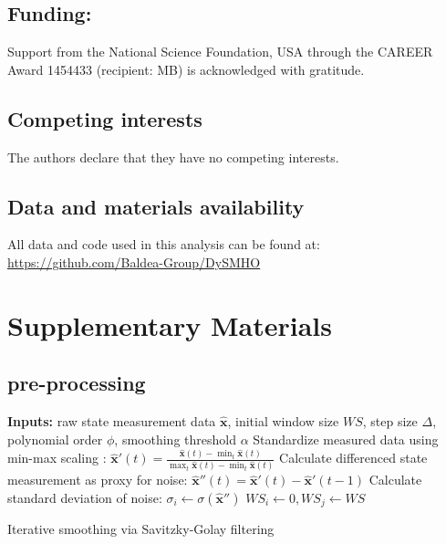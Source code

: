 \documentclass[12pt]{article}
\begin{document}
\subsection*{Funding:}
Support from the National Science Foundation, USA through the CAREER Award 1454433 (recipient: MB) is acknowledged with gratitude.



\subsection*{Competing interests}
The authors declare that they have no competing interests.

\subsection*{Data and materials availability}
All data and code used in this analysis can be found at: \url{https://github.com/Baldea-Group/DySMHO}



\clearpage 

\section*{Supplementary Materials} 


\renewcommand{\thesection}{S\arabic{section}}
\renewcommand{\thesubsection}{S\arabic{subsection}}
\renewcommand{\theequation}{S.\arabic{equation}}
\renewcommand{\thefigure}{S.\arabic{figure}}
\renewcommand{\thetable}{S.\arabic{table}}
\renewcommand{\thealgocf}{S.\arabic{algocf}}

\subsection[S]{\ours{} pre-processing}


\vspace{0.5cm}
\begin{algorithm}[H]
\SetAlgoLined
{}
 \textbf{Inputs:} raw state measurement data $\hat{\textbf{x}}$, initial window size $WS$, step size $\Delta$, polynomial order $\phi$, smoothing threshold $\alpha$\;
Standardize measured data using min-max scaling : $\hat{\textbf{x}}'(t)=\frac{\hat{\textbf{x}}(t)-\min_t \hat{\textbf{x}}(t) }{\max_t \hat{\textbf{x}}(t) - \min_t \hat{\textbf{x}}(t)}$ \;
Calculate differenced state measurement as proxy for noise: $\hat{\textbf{x}}''(t) = \hat{\textbf{x}}'(t) - \hat{\textbf{x}}'({t-1}) $\;
 Calculate standard deviation of noise: $\sigma_{i} \leftarrow \sigma(\hat{\textbf{x}}'')$\;
 $WS_i \leftarrow 0, WS_j \leftarrow WS$ \;
 \caption{Iterative smoothing via Savitzky-Golay filtering}
\end{algorithm}
\end{document}
